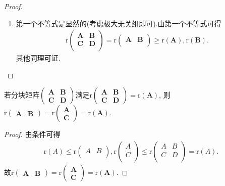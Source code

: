 \documentclass[../../main.tex]{subfiles}%
\begin{document}
\begin{proof}
\begin{enumerate}[(1)]
\item 第一个不等式是显然的(考虑极大无关组即可).由第一个不等式可得
\begin{align*}
\mathrm{r}\left( \begin{matrix}
\boldsymbol{A}&		\boldsymbol{B}\\
\boldsymbol{C}&		\boldsymbol{D}\\
\end{matrix} \right) =\mathrm{r}\left( \begin{matrix}
\boldsymbol{A}&		\boldsymbol{B}\\
\end{matrix} \right) \geqslant \mathrm{r}\left( \boldsymbol{A} \right) ,\mathrm{r}\left( \boldsymbol{B} \right) .
\end{align*}
其他同理可证.
\end{enumerate}
\end{proof}

\begin{corollary}\label{corollary:列分块与行分块秩等于其交叉块的秩}
若分块矩阵\(\begin{pmatrix}
\boldsymbol{A}&\boldsymbol{B}\\
\boldsymbol{C}&\boldsymbol{D}
\end{pmatrix}\)满足\(\mathrm{r}\begin{pmatrix}
\boldsymbol{A}&\boldsymbol{B}\\
\boldsymbol{C}&\boldsymbol{D}
\end{pmatrix}=\mathrm{r}(\boldsymbol{A})\), 则\(\mathrm{r}\begin{pmatrix}
\boldsymbol{A}&\boldsymbol{B}
\end{pmatrix}=\mathrm{r}\begin{pmatrix}
\boldsymbol{A}\\
\boldsymbol{C}
\end{pmatrix}=\mathrm{r}(\boldsymbol{A})\).
\end{corollary}
\begin{proof}
由条件可得
\begin{align*}
\mathrm{r}\left( A \right) \leqslant \mathrm{r}\left( \begin{matrix}
A&		B\\
\end{matrix} \right) ,\mathrm{r}\left( \begin{array}{c}
A\\
C\\
\end{array} \right) \leqslant \mathrm{r}\left( \begin{matrix}
A&		B\\
C&		D\\
\end{matrix} \right) =\mathrm{r}\left( A \right) .
\end{align*}
故\(\mathrm{r}\begin{pmatrix}
\boldsymbol{A}&\boldsymbol{B}
\end{pmatrix}=\mathrm{r}\begin{pmatrix}
\boldsymbol{A}\\
\boldsymbol{C}
\end{pmatrix}=\mathrm{r}(\boldsymbol{A})\).
\end{proof}
\end{document}
